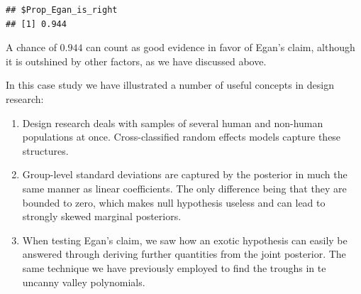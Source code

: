 \documentclass[]{svmono}
\newenvironment{Shaded}{\begin{snugshade}}{\end{snugshade}}
\newcommand{\KeywordTok}[1]{\textcolor[rgb]{0.13,0.29,0.53}{\textbf{#1}}}
\newcommand{\DataTypeTok}[1]{\textcolor[rgb]{0.13,0.29,0.53}{#1}}
\newcommand{\DecValTok}[1]{\textcolor[rgb]{0.00,0.00,0.81}{#1}}
\newcommand{\StringTok}[1]{\textcolor[rgb]{0.31,0.60,0.02}{#1}}
\newcommand{\OperatorTok}[1]{\textcolor[rgb]{0.81,0.36,0.00}{\textbf{#1}}}
\newcommand{\NormalTok}[1]{#1}
\providecommand{\tightlist}{%
  \setlength{\itemsep}{0pt}\setlength{\parskip}{0pt}}
\theoremstyle{definition}
\theoremstyle{definition}
\theoremstyle{definition}
\theoremstyle{remark}
\begin{document}
\begin{Shaded}
\end{Shaded}

\begin{verbatim}
## $Prop_Egan_is_right
## [1] 0.944
\end{verbatim}

A chance of \(0.944\) can count as good evidence in favor of Egan's
claim, although it is outshined by other factors, as we have discussed
above.

In this case study we have illustrated a number of useful concepts in
design research:

\begin{enumerate}
\def\labelenumi{\arabic{enumi}.}
\tightlist
\item
  Design research deals with samples of several human and non-human
  populations at once. Cross-classified random effects models capture
  these structures.
\item
  Group-level standard deviations are captured by the posterior in much
  the same manner as linear coefficients. The only difference being that
  they are bounded to zero, which makes null hypothesis useless and can
  lead to strongly skewed marginal posteriors.
\item
  When testing Egan's claim, we saw how an exotic hypothesis can easily
  be answered through deriving further quantities from the joint
  posterior. The same technique we have previously employed to find the
  troughs in te uncanny valley polynomials.
\end{enumerate}
\end{document}

